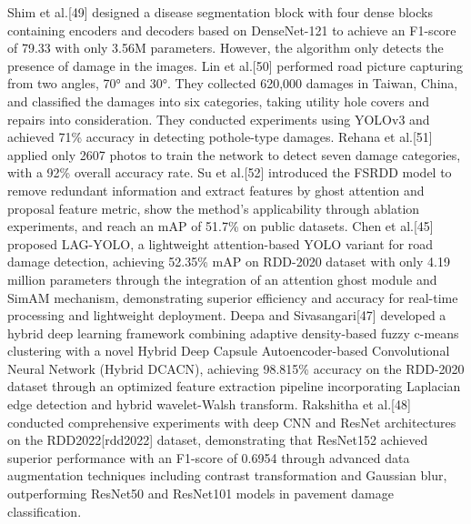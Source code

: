 \documentclass[sensors,article,submit,moreauthors]{Definitions/mdpi}
\begin{document}
    Shim et al.[49]\citep{shim2021road} designed a disease segmentation block with four dense blocks containing encoders and decoders based on DenseNet-121 to achieve an F1-score of 79.33 with only 3.56M parameters. However, the algorithm only detects the presence of damage in the images. Lin et al.[50]\citep{lin2021implementation} performed road picture capturing from two angles, 70° and 30°. They collected 620,000 damages in Taiwan, China, and classified the damages into six categories, taking utility hole covers and repairs into consideration. They conducted experiments using YOLOv3 and achieved 71\% accuracy in detecting pothole-type damages. Rehana et al.[51]\citep{rehanak2022road} applied only 2607 photos to train the network to detect seven damage categories, with a 92\% overall accuracy rate. Su et al.[52]\citep{su2022fsrdd} introduced the FSRDD model to remove redundant information and extract features by ghost attention and proposal feature metric, show the method’s applicability through ablation experiments, and reach an mAP of 51.7\% on public datasets. Chen et al.[45]\citep{chen2024lag} proposed LAG-YOLO, a lightweight attention-based YOLO variant for road damage detection, achieving 52.35\% mAP on RDD-2020 dataset with only 4.19 million parameters through the integration of an attention ghost module and SimAM mechanism, demonstrating superior efficiency and accuracy for real-time processing and lightweight deployment. Deepa and Sivasangari[47]\citep{deepa2023effective} developed a hybrid deep learning framework combining adaptive density-based fuzzy c-means clustering with a novel Hybrid Deep Capsule Autoencoder-based Convolutional Neural Network (Hybrid DCACN), achieving 98.815\% accuracy on the RDD-2020 dataset through an optimized feature extraction pipeline incorporating Laplacian edge detection and hybrid wavelet-Walsh transform. Rakshitha et al.[48]\citep{rakshitha2024deep} conducted comprehensive experiments with deep CNN and ResNet architectures on the RDD2022[rdd2022] dataset, demonstrating that ResNet152 achieved superior performance with an F1-score of 0.6954 through advanced data augmentation techniques including contrast transformation and Gaussian blur, outperforming ResNet50 and ResNet101 models in pavement damage classification.

\end{document}
